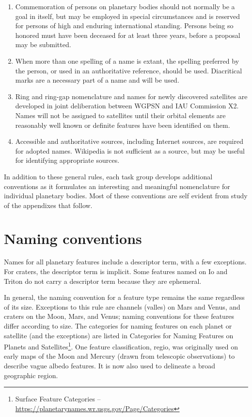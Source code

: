 \begin{enumerate}
\item Commemoration of persons on planetary bodies should not normally be a goal in itself, 
      but may be employed in special circumstances and is reserved for persons of high and enduring international standing. 
	  Persons being so honored must have been deceased for at least three years, before a proposal may be submitted.
\item When more than one spelling of a name is extant, the spelling preferred by the person, or used in an authoritative reference, should be used. 
      Diacritical marks are a necessary part of a name and will be used.
\item Ring and ring-gap nomenclature and names for newly discovered satellites are developed in joint deliberation 
      between WGPSN and IAU Commission X2. Names will not be assigned to satellites until their orbital elements are 
	  reasonably well known or definite features have been identified on them.
\item Accessible and authoritative sources, including Internet sources, are required for adopted names. 
      Wikipedia is not sufficient as a source, but may be useful for identifying appropriate sources.
\end{enumerate}

\noindent In addition to these general rules, each task group develops additional conventions as it formulates an interesting 
and meaningful nomenclature for individual planetary bodies. Most of these conventions are self evident from study of the appendixes that follow.

\section{Naming conventions}
\label{sec:Nomenclature:NamingConventions}
Names for all planetary features include a descriptor term, with a few exceptions. For craters, the descriptor term is implicit. 
Some features named on Io and Triton do not carry a descriptor term because they are ephemeral.

In general, the naming convention for a feature type remains the same regardless of its size. 
Exceptions to this rule are channels (valles) on Mars and Venus, and craters on the Moon, Mars, and Venus; 
naming conventions for these features differ according to size. 
The categories for naming features on each planet or satellite (and the exceptions) are listed in 
Categories for Naming Features on Planets and Satellites\footnote{%
   Surface Feature Categories -- \url{https://planetarynames.wr.usgs.gov/Page/Categories}}. 
One feature classification, regio, was originally used on early maps of the Moon and Mercury (drawn from telescopic observations) 
to describe vague albedo features. It is now also used to delineate a broad geographic region.

